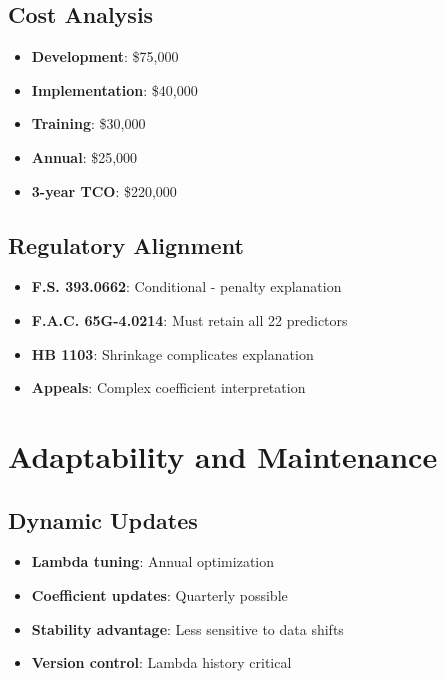 \subsection{Cost Analysis}

\begin{itemize}
    \item \textbf{Development}: \$75,000
    \item \textbf{Implementation}: \$40,000
    \item \textbf{Training}: \$30,000
    \item \textbf{Annual}: \$25,000
    \item \textbf{3-year TCO}: \$220,000
\end{itemize}

\subsection{Regulatory Alignment}

\begin{itemize}
    \item \textbf{F.S. 393.0662}:  Conditional - penalty explanation
    \item \textbf{F.A.C. 65G-4.0214}:  Must retain all 22 predictors
    \item \textbf{HB 1103}:  Shrinkage complicates explanation
    \item \textbf{Appeals}:  Complex coefficient interpretation
\end{itemize}

\section{Adaptability and Maintenance}

\subsection{Dynamic Updates}

\begin{itemize}
    \item \textbf{Lambda tuning}: Annual optimization
    \item \textbf{Coefficient updates}: Quarterly possible
    \item \textbf{Stability advantage}: Less sensitive to data shifts
    \item \textbf{Version control}: Lambda history critical
\end{itemize}

